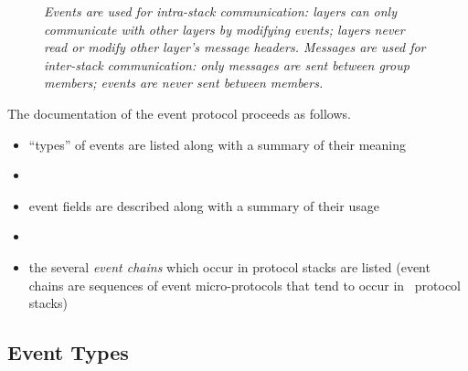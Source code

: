 \begin{figure}[tb]
\begin{center}
\end{center}
\caption{\em Events are used for intra-stack communication: layers can only
communicate with other layers by modifying events; layers never read or
modify other layer's message headers.  Messages are used for inter-stack
communication: only messages are sent between group members; events are
never sent between members.}
\label{comm:event}
\end{figure}

The documentation of the event protocol proceeds as follows.
\begin{itemize}
\item
``types'' of events are listed along with a summary of their meaning
\item
{}
\item
event fields are described along with a summary of their usage
\item
{}
\item
the several \emph{event chains} which occur in protocol stacks are listed
(event chains are sequences of event micro-protocols that tend to occur in
\ensemble\ protocol stacks)
\end{itemize}

\subsection{Event Types}

